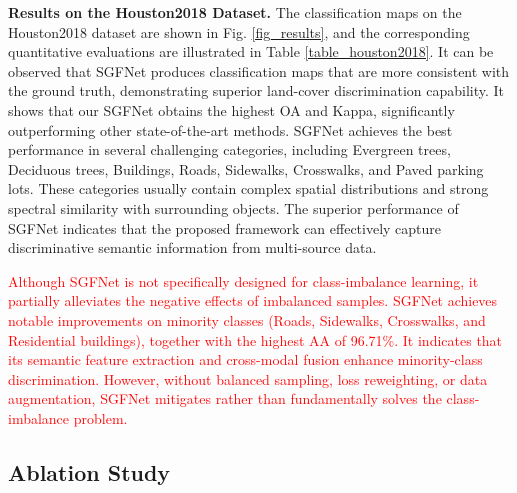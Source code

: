 \textbf{Results on the Houston2018 Dataset.} The classification maps on the Houston2018 dataset are shown in Fig. \ref{fig_results}, and the corresponding quantitative evaluations are illustrated in Table \ref{table_houston2018}. It can be observed that SGFNet produces classification maps that are more consistent with the ground truth, demonstrating superior land-cover discrimination capability. It shows that our SGFNet obtains the highest OA and Kappa, significantly outperforming other state-of-the-art methods. SGFNet achieves the best performance in several challenging categories, including Evergreen trees, Deciduous trees, Buildings, Roads, Sidewalks, Crosswalks, and Paved parking lots. These categories usually contain complex spatial distributions and strong spectral similarity with surrounding objects. The superior performance of SGFNet indicates that the proposed framework can effectively capture discriminative semantic information from multi-source data.

\textcolor{red}{Although SGFNet is not specifically designed for class-imbalance learning, it partially alleviates the negative effects of imbalanced samples. SGFNet achieves notable improvements on minority classes (Roads, Sidewalks, Crosswalks, and Residential buildings), together with the highest AA of 96.71\%. It indicates that its semantic feature extraction and cross-modal fusion enhance minority-class discrimination. However, without balanced sampling, loss reweighting, or data augmentation, SGFNet mitigates rather than fundamentally solves the class-imbalance problem.}


\begin{table}[!t]
\centering
\caption{Ablation study of the proposed SGFNet.}
\label{table_ablation}
\end{table}

\subsection{Ablation Study}

